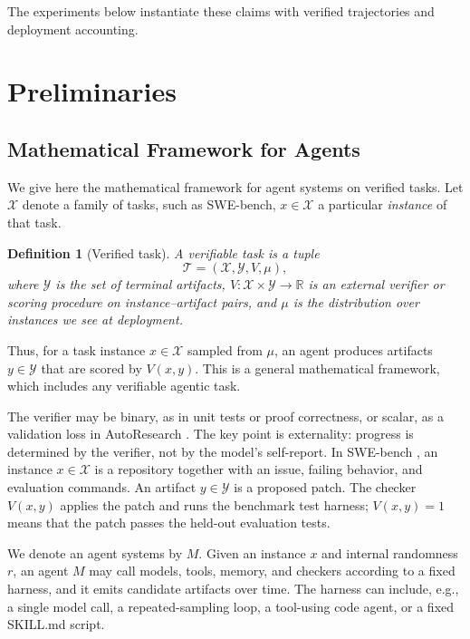 \documentclass{article}
\newtheorem{definition}{Definition}
\newcommand{\cX}{\mathcal{X}}
\newcommand{\cY}{\mathcal{Y}}
\begin{document}
The experiments below instantiate these claims with verified trajectories and deployment accounting.

\section{Preliminaries}
\label{sec:framework}

\subsection{Mathematical Framework for Agents}
We give here the mathematical framework for agent systems on verified tasks. Let \(\mathcal X\) denote a family of tasks, such as
SWE-bench, \(x\in\mathcal X\) a particular \textit{instance} of that task.

\begin{definition}[Verified task]
\label{def:verified-task}
A verifiable task is a tuple
\[
\mathcal T=(\mathcal X,\mathcal Y,V,\mu),
\]
where $\mathcal Y$ is the set of terminal artifacts,
$V: \mathcal{X} \times \mathcal{Y} \to \mathbb R$ is an external verifier or scoring procedure on instance--artifact pairs, and
$\mu$ is the distribution over instances we see at deployment.
\end{definition}
Thus, for a task instance $x\in\mathcal X$ sampled from $\mu$, an agent produces artifacts $y\in\mathcal Y$ that are scored by $V(x,y)$. This is a general mathematical framework, which includes any verifiable agentic task.

The verifier may be binary, as in unit tests or proof correctness, or scalar, as a validation loss in AutoResearch \citep{karpathy2026autoresearch}.
The key point is externality: progress is determined by the verifier, not by the model's self-report.
In SWE-bench \citet{jimenez2024swebench}, an instance \(x\in\cX\) is a repository together with an issue, failing behavior, and evaluation commands.
An artifact \(y\in\cY\) is a proposed patch.
The checker \(V(x,y)\) applies the patch and runs the benchmark test harness; \(V(x,y)=1\) means that the patch passes the held-out evaluation tests.

We denote an agent systems by $M$.
Given an instance \(x\) and internal randomness \(r\), an agent $M$ may call models, tools, memory, and checkers according to a fixed harness, and it emits candidate artifacts over time. The harness can include, e.g., a single model call, a repeated-sampling loop, a tool-using code agent, or a fixed SKILL.md script.
\end{document}
